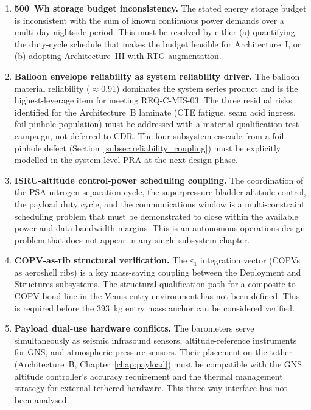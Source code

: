 \begin{enumerate}
    \item \textbf{500~Wh storage budget inconsistency.} The stated energy storage budget is inconsistent with the sum of known continuous power demands over a multi-day nightside period. This must be resolved by either (a) quantifying the duty-cycle schedule that makes the budget feasible for Architecture~I, or (b) adopting Architecture~III with RTG augmentation.

    \item \textbf{Balloon envelope reliability as system reliability driver.} The balloon material reliability ($\approx$0.91) dominates the system series product and is the highest-leverage item for meeting REQ-C-MIS-03. The three residual risks identified for the Architecture~B laminate (CTE fatigue, seam acid ingress, foil pinhole population) must be addressed with a material qualification test campaign, not deferred to CDR. The four-subsystem cascade from a foil pinhole defect (Section~\ref{subsec:reliability_coupling}) must be explicitly modelled in the system-level PRA at the next design phase.

    \item \textbf{ISRU-altitude control-power scheduling coupling.} The coordination of the PSA nitrogen separation cycle, the superpressure bladder altitude control, the payload duty cycle, and the communications window is a multi-constraint scheduling problem that must be demonstrated to close within the available power and data bandwidth margins. This is an autonomous operations design problem that does not appear in any single subsystem chapter.

    \item \textbf{COPV-as-rib structural verification.} The $\varepsilon_1$ integration vector (COPVs as aeroshell ribs) is a key mass-saving coupling between the Deployment and Structures subsystems. The structural qualification path for a composite-to-COPV bond line in the Venus entry environment has not been defined. This is required before the 393~kg entry mass anchor can be considered verified.

    \item \textbf{Payload dual-use hardware conflicts.} The barometers serve simultaneously as seismic infrasound sensors, altitude-reference instruments for GNS, and atmospheric pressure sensors. Their placement on the tether (Architecture~B, Chapter~\ref{chap:payload}) must be compatible with the GNS altitude controller's accuracy requirement and the thermal management strategy for external tethered hardware. This three-way interface has not been analysed.
\end{enumerate}